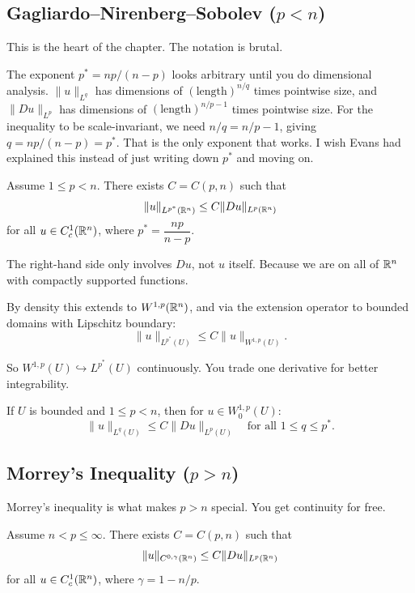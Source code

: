 \subsection{Gagliardo--Nirenberg--Sobolev ($p < n$)}
\label{thm:GNS}

This is the heart of the chapter. The notation is brutal.

The exponent $p^* = np/(n-p)$ looks arbitrary until you do dimensional analysis. $\|u\|_{L^q}$ has dimensions of $(\text{length})^{n/q}$ times pointwise size, and $\|Du\|_{L^p}$ has dimensions of $(\text{length})^{n/p - 1}$ times pointwise size. For the inequality to be scale-invariant, we need $n/q = n/p - 1$, giving $q = np/(n-p) = p^*$. That is the only exponent that works. I wish Evans had explained this instead of just writing down $p^*$ and moving on.

\begin{theorem}
\label{thm:gns}
Assume $1 \leq p < n$. There exists $C = C(p,n)$ such that
\[
    \|u\|_{L^{p^*}(\mathbb{R}^n)} \leq C \|Du\|_{L^p(\mathbb{R}^n)}
\]
for all $u \in C^1_c(\mathbb{R}^n)$, where $p^* = \dfrac{np}{n-p}$.
\end{theorem}

The right-hand side only involves $Du$, not $u$ itself. Because we are on all of $\mathbb{R}^n$ with compactly supported functions.

By density this extends to $W^{1,p}(\mathbb{R}^n)$, and via the extension operator to bounded domains with Lipschitz boundary:
\[
    \|u\|_{L^{p^*}(U)} \leq C \|u\|_{W^{1,p}(U)}.
\]

So $W^{1,p}(U) \hookrightarrow L^{p^*}(U)$ continuously. You trade one derivative for better integrability.

\begin{corollary}
\label{cor:poincare}
If $U$ is bounded and $1 \leq p < n$, then for $u \in W^{1,p}_0(U)$:
\[
    \|u\|_{L^q(U)} \leq C \|Du\|_{L^p(U)} \quad \text{for all } 1 \leq q \leq p^*.
\]
\end{corollary}


\subsection{Morrey's Inequality ($p > n$)}

Morrey's inequality is what makes $p > n$ special. You get continuity for free.

\begin{theorem}
\label{thm:morrey}
Assume $n < p \leq \infty$. There exists $C = C(p,n)$ such that
\[
    \|u\|_{C^{0,\gamma}(\mathbb{R}^n)} \leq C \|Du\|_{L^p(\mathbb{R}^n)}
\]
for all $u \in C^1_c(\mathbb{R}^n)$, where $\gamma = 1 - n/p$.
\end{theorem}

